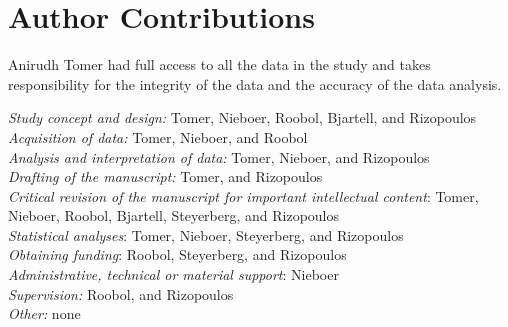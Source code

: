\section*{Author Contributions}
Anirudh Tomer had full access to all the data in the study and takes responsibility for the integrity of the data and the accuracy of the data analysis.

\textit{Study concept and design:} Tomer, Nieboer, Roobol, Bjartell, and Rizopoulos\\
\textit{Acquisition of data:} Tomer, Nieboer, and Roobol\\
\textit{Analysis and interpretation of data:} Tomer, Nieboer, and Rizopoulos\\
\textit{Drafting of the manuscript:} Tomer, and Rizopoulos\\
\textit{Critical revision of the manuscript for important intellectual content}: Tomer, Nieboer, Roobol, Bjartell, Steyerberg, and Rizopoulos\\
\textit{Statistical analyses}: Tomer, Nieboer, Steyerberg, and Rizopoulos\\
\textit{Obtaining funding}: Roobol, Steyerberg, and Rizopoulos\\
\textit{Administrative, technical or material support}: Nieboer\\
\textit{Supervision:} Roobol, and Rizopoulos\\
\textit{Other:} none